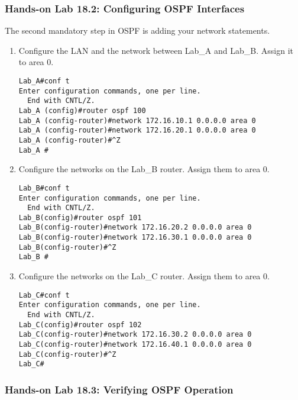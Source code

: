\subsubsection[Hands-on Lab 18.2: Configuring OSPF
Interfaces]{\texorpdfstring{\protect\hypertarget{c18.xhtmlux5cux23c18-sec-22}{}{}Hands-on
Lab 18.2: Configuring OSPF
Interfaces}{Hands-on Lab 18.2: Configuring OSPF Interfaces}}

The second mandatory step in OSPF is adding your network statements.

\begin{enumerate}
\item
  Configure the LAN and the network between Lab\_A and Lab\_B. Assign it
  to area 0.

\begin{verbatim}
Lab_A#conf t
Enter configuration commands, one per line.
  End with CNTL/Z.
Lab_A (config)#router ospf 100
Lab_A (config-router)#network 172.16.10.1 0.0.0.0 area 0
Lab_A (config-router)#network 172.16.20.1 0.0.0.0 area 0
Lab_A (config-router)#^Z
Lab_A #
\end{verbatim}
\item
  Configure the networks on the Lab\_B router. Assign them to area 0.

\begin{verbatim}
Lab_B#conf t
Enter configuration commands, one per line.
  End with CNTL/Z.
Lab_B(config)#router ospf 101
Lab_B(config-router)#network 172.16.20.2 0.0.0.0 area 0
Lab_B(config-router)#network 172.16.30.1 0.0.0.0 area 0
Lab_B(config-router)#^Z
Lab_B #
\end{verbatim}
\item
  Configure the networks on the Lab\_C router. Assign them to area 0.

\begin{verbatim}
Lab_C#conf t
Enter configuration commands, one per line.
  End with CNTL/Z.
Lab_C(config)#router ospf 102
Lab_C(config-router)#network 172.16.30.2 0.0.0.0 area 0
Lab_C(config-router)#network 172.16.40.1 0.0.0.0 area 0
Lab_C(config-router)#^Z
Lab_C#
\end{verbatim}
\end{enumerate}

\subsubsection[Hands-on Lab 18.3: Verifying OSPF
Operation]{\texorpdfstring{\protect\hypertarget{c18.xhtmlux5cux23c18-sec-23}{}{}Hands-on
Lab 18.3: Verifying OSPF
Operation}{Hands-on Lab 18.3: Verifying OSPF Operation}}


